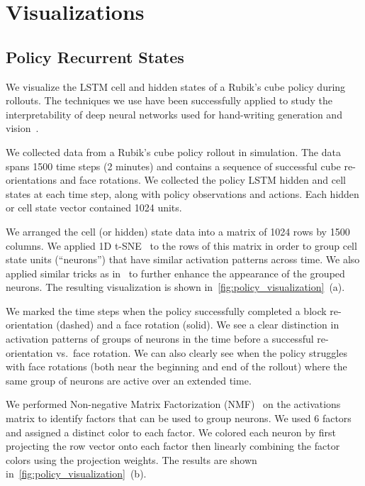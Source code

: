 \section{Visualizations}
\label{app:visualizations}

\subsection{Policy Recurrent States}
\label{app:policy_visualizations}
We visualize the LSTM cell and hidden states of a Rubik's cube policy during rollouts. The techniques we use have been successfully applied to study the interpretability of deep neural networks used for hand-writing generation and vision~\cite{carter2016experiments, olah2018the}.

We collected data from a Rubik's cube policy rollout in simulation. The data spans 1500 time steps (2 minutes) and contains a sequence of successful cube re-orientations and face rotations. We collected the policy LSTM hidden and cell states at each time step, along with policy observations and actions. Each hidden or cell state vector contained 1024 units.

We arranged the cell (or hidden) state data into a matrix of 1024 rows by 1500 columns. We applied 1D t-SNE~\cite{vanDerMaaten2008} to the rows of this matrix in order to group cell state units (``neurons'') that have similar activation patterns across time. We also applied similar tricks as in~\cite{carter2016experiments} to further enhance the appearance of the grouped neurons. The resulting visualization is shown in~\autoref{fig:policy_visualization}~(a). 

We marked the time steps when the policy successfully completed a block re-orientation (dashed) and a face rotation (solid). We see a clear distinction in activation patterns of groups of neurons in the time before a successful re-orientation vs.~face rotation. We can also clearly see when the policy struggles with face rotations (both near the beginning and end of the rollout) where the same group of neurons are active over an extended time.

We performed Non-negative Matrix Factorization (NMF)~\cite{olah2018the} on the activations matrix to identify factors that can be used to group neurons. We used 6 factors and assigned a distinct color to each factor. We colored each neuron by first projecting the row vector onto each factor then linearly combining the factor colors using the projection weights. The results are shown in~\autoref{fig:policy_visualization}~(b).


